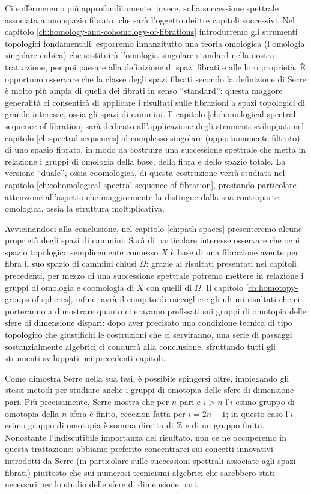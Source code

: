 Ci soffermeremo più approfonditamente, invece, sulla successione spettrale associata a uno spazio fibrato, che sarà l'oggetto dei tre capitoli successivi. Nel capitolo \ref{ch:homology-and-cohomology-of-fibrations} introdurremo gli strumenti topologici fondamentali: esporremo innanzitutto una teoria omologica (l'omologia singolare cubica) che sostituirà l'omologia singolare standard nella nostra trattazione, per poi passare alla definizione di spazi fibrati e alle loro proprietà. È opportuno osservare che la classe degli spazi fibrati secondo la definizione di Serre è molto più ampia di quella dei fibrati in senso \enquote{standard}: questa maggore generalità ci consentirà di applicare i risultati sulle fibrazioni a spazi topologici di grande interesse, ossia gli spazi di cammini. Il capitolo \ref{ch:homological-spectral-sequence-of-fibration} sarà dedicato all'applicazione degli strumenti sviluppati nel capitolo \ref{ch:spectral-sequences} al complesso singolare (opportunamente filtrato) di uno spazio fibrato, in modo da costruire una successione spettrale che metta in relazione i gruppi di omologia della base, della fibra e dello spazio totale. La versione \enquote{duale}, ossia coomologica, di questa costruzione verrà studiata nel capitolo \ref{ch:cohomological-spectral-sequence-of-fibration}, prestando particolare attenzione all'aspetto che maggiormente la distingue dalla sua controparte omologica, ossia la struttura moltiplicativa.

Avvicinandoci alla conclusione, nel capitolo \ref{ch:path-spaces} presenteremo alcune proprietà degli spazi di cammini. Sarà di particolare interesse osservare che ogni spazio topologico semplicemente connesso \(X\) è base di una fibrazione avente per fibra il suo spazio di cammini chiusi \(\Omega\): grazie ai risultati presentati nei capitoli precedenti, per mezzo di una successione spettrale potremo mettere in relazione i gruppi di omologia e coomologia di \(X\) con quelli di \(\Omega\). Il capitolo \ref{ch:homotopy-groups-of-spheres}, infine, avrà il compito di raccogliere gli ultimi risultati che ci porteranno a dimostrare quanto ci eravamo prefissati sui gruppi di omotopia delle sfere di dimensione dispari: dopo aver precisato una condizione tecnica di tipo topologico che giustifichi le costruzioni che ci serviranno, una serie di passaggi sostanzialmente algebrici ci condurrà alla conclusione, sfruttando tutti gli strumenti sviluppati nei precedenti capitoli.

Come dimostra Serre nella sua tesi, è possibile spingersi oltre, impiegando gli stessi metodi per studiare anche i gruppi di omotopia delle sfere di dimensione pari. Più precisamente, Serre mostra che per \(n\) pari e \(i>n\) l'\(i\)-esimo gruppo di omotopia della \(n\)-sfera è finito, eccezion fatta per \(i=2n-1\); in questo caso l'\(i\)-esimo gruppo di omotopia è somma diretta di \(\mathbb{Z}\) e di un gruppo finito. Nonostante l'indiscutibile importanza del risultato, non ce ne occuperemo in questa trattazione: abbiamo preferito concentrarci sui concetti innovativi introdotti da Serre (in particolare sulle successioni spettrali associate agli spazi fibrati) piuttosto che sui numerosi tecnicismi algebrici che sarebbero stati necessari per lo studio delle sfere di dimensione pari.
